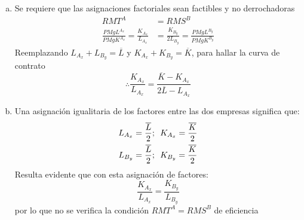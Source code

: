 \begin{enumerate}[a)]
	\item Se requiere que las asignaciones factoriales sean factibles y no derrochadoras
			\begin{align*}
				RMT^A & = RMS^B\\
				\frac{PMgL^{A_x}}{PMgK^{A_x}} =\frac{K_{A_x}}{L_{A_x}} & = \frac{K_{B_y}}{2L_{B_y}} =\frac{PMgL^{B_y}}{PMgK^{B_y}}
			\end{align*}
		  Reemplazando $L_{A_x} + L_{B_y} = \overline{L}$ y $K_{A_x} + K_{B_y} = \overline{K}$, para hallar la curva de contrato
			$$\therefore \frac{K_{A_x}}{L_{A_x}} = \frac{\overline{K} - K_{A_x}}{2\overline{L} - L_{A_x}}$$
	\item Una asignación igualitaria de los factores entre las dos empresas significa que:
			\begin{gather*}
				L_{A_x} = \frac{\overline{L}}{2};\enskip K_{A_x}=\frac{\overline{K}}{2}\\
				L_{B_y} = \frac{\overline{L}}{2};\enskip K_{B_y}=\frac{\overline{K}}{2}
			\end{gather*}
		  Resulta evidente que con esta asignación de factores:
		  	$$\frac{K_{A_x}}{L_{A_x}} = \frac{K_{B_y}}{L_{B_y}}$$
		  por lo que no se verifica la condición $RMT^A = RMS^B$ de eficiencia
\end{enumerate}